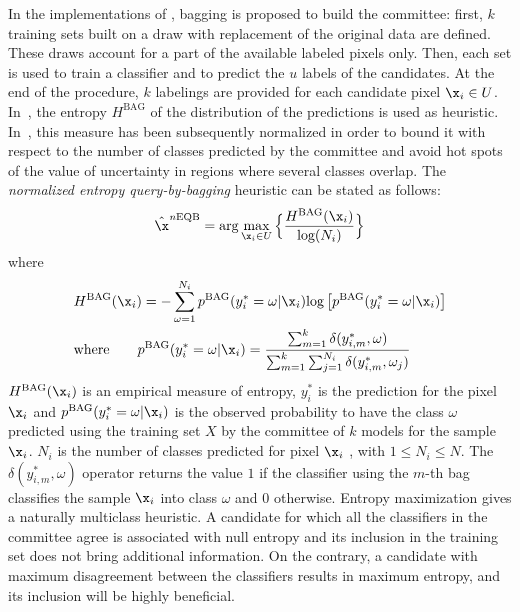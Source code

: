 \label{sec:EQB}
In the implementations of , bagging   is proposed to build the committee: first, $k$ training sets built on a draw with replacement of the original data are defined. These draws account for a part of the available labeled pixels only. Then, each set is used to train a classifier and to predict the $u$ labels of the candidates. At the end of the procedure, $k$ labelings are provided for each candidate pixel $\x_i \in U$.
In~, the entropy $H^{\text{BAG}}$ of the distribution of the predictions  is used as heuristic. In~, this measure has been subsequently normalized in order to bound it with respect to the number of classes predicted by the committee and avoid hot spots of the value of uncertainty in regions where several classes overlap. The \emph{normalized entropy query-by-bagging} heuristic can be stated as follows:
\begin{equation}
	\hat{\x}^{\text{\emph{n}EQB}} = \arg\max_{\x_i \in U}\Big\{\frac{H^{\text{BAG}}(\x_i)}{ \mbox{log}(N_i)}\Big\}
\label{eq:neqb}
\end{equation}
where
\begin{align}
	&H^{\text{BAG}}(\x_i) = -\sum_{\omega=1}^{N_i} p^{\text{BAG}}(y_i^* = \omega|\x_i) \mbox{log}\left[p^{\text{BAG}}(y^*_i= \omega|\x_i)\right]\\
		& \text{where} \qquad p^{\text{BAG}}(y^*_i = \omega|\x_i) = \frac{\sum_{m=1}^k \delta(y_{i,m}^{*}, \omega )}{\sum_{m=1}^k\sum_{j = 1}^{N_i} \delta(y_{i,m}^*, \omega_j ) } \nonumber 
\label{eq:entropy}
\end{align}
$H^{\text{BAG}}(\x_i)$ is an empirical measure of entropy, $y_i^*$ is the prediction for the pixel $\x_i$ and $p^{\text{BAG}}(y^*_i = \omega|\x_i)$ is the observed probability to have the class $\omega$ predicted using the training set $X$ by the committee of $k$ models for the sample $\x_i$. $N_i$ is the number of classes predicted for pixel $\x_i$ , with $1 \leq N_i \leq N$. The $\delta(y_{i,m}^*,\omega)$ operator returns the value $1$ if the classifier using the $m$-th bag classifies the sample $\x_i$ into class $\omega$ and $0$ otherwise. Entropy maximization gives a naturally multiclass heuristic. A candidate for which all the classifiers in the committee agree is associated with null entropy and its inclusion in the  training set does not bring additional information. On the contrary, a candidate with maximum disagreement between the classifiers results in maximum entropy, and its inclusion will be highly beneficial.

